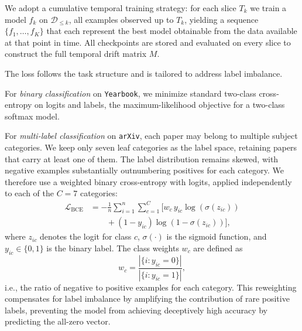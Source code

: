 We adopt a cumulative temporal training strategy: for each slice $T_k$ we train a model $f_k$ on $\mathcal{D}_{\leq k}$, all examples observed up to $T_k$, yielding a sequence $\{f_1, \dots, f_K\}$ that each represent the best model obtainable from the data available at that point in time. All checkpoints are stored and evaluated on every slice to construct the full temporal drift matrix $M$.

The loss follows the task structure and is tailored to address label imbalance.

For \emph{binary classification} on \texttt{Yearbook}, we minimize standard two-class cross-entropy on logits and labels, the maximum-likelihood objective for a two-class softmax model.

\ifverbosemath
For \emph{multi-label classification} on \texttt{arXiv}, each paper may belong to multiple subject categories. We keep only seven leaf categories as the label space, retaining papers that carry at least one of them. The label distribution remains skewed, with negative examples substantially outnumbering positives for each category. We therefore use a weighted binary cross-entropy with logits, applied independently to each of the $C = 7$ categories:
\begin{equation}
\begin{aligned}
\mathcal{L}_{\text{BCE}}
    &= -\frac{1}{n}\sum_{i=1}^{n} \sum_{c=1}^{C}
       \big[ w_c \, y_{ic} \log(\sigma(z_{ic})) \\
    &\qquad + (1-y_{ic}) \log(1-\sigma(z_{ic})) \big],
\end{aligned}
\end{equation}
where $z_{ic}$ denotes the logit for class $c$, $\sigma(\cdot)$ is the sigmoid function, and $y_{ic} \in \{0,1\}$ is the binary label. The class weights $w_c$ are defined as
\begin{equation}
    w_c = \frac{|\{i : y_{ic} = 0\}|}{|\{i : y_{ic} = 1\}|},
\end{equation}
i.e., the ratio of negative to positive examples for each category. This reweighting compensates for label imbalance by amplifying the contribution of rare positive labels, preventing the model from achieving deceptively high accuracy by predicting the all-zero vector.

